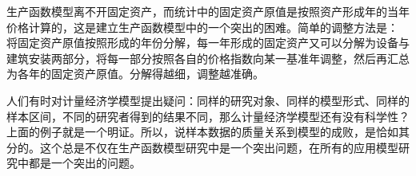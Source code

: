 生产函数模型离不开固定资产，而统计中的固定资产原值是按照资产形成年的当年价格计算的，这是建立生产函数模型中的一个突出的困难。简单的调整方法是：
将固定资产原值按照形成的年份分解，每一年形成的固定资产又可以分解为设备与建筑安装两部分，将每一部分按照各自的价格指数向某一基准年调整，然后再汇总为各年的固定资产原值。分解得越细，调整越准确。
	
人们有时对计量经济学模型提出疑问：同样的研究对象、同样的模型形式、同样的样本区间，不同的研究者得到的结果不同，那么计量经济学模型还有没有科学性？
上面的例子就是一个明证。所以，说样本数据的质量关系到模型的成败，是恰如其分的。这个总是不仅在生产函数模型研究中是一个突出问题，在所有的应用模型研究中都是一个突出的问题。  

